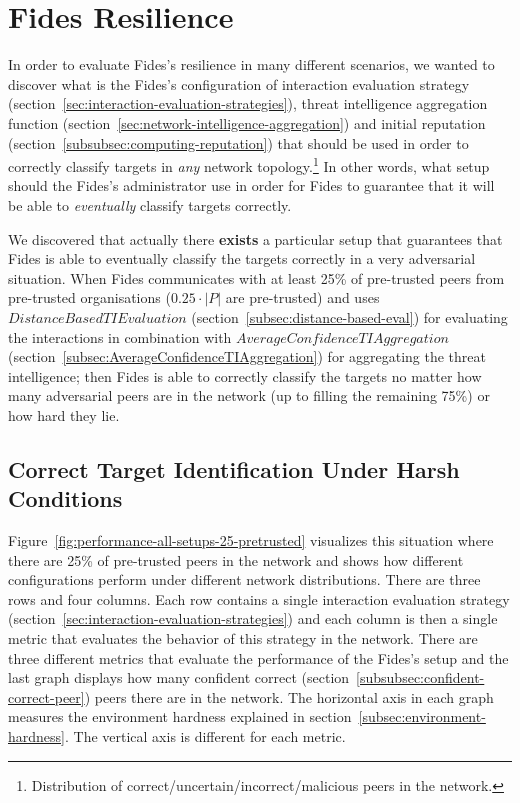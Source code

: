 \newpage
\section{Fides Resilience}
\label{sec:fides-resilience}

In order to evaluate Fides's resilience in many different scenarios, we wanted to discover what is the Fides's configuration of interaction evaluation strategy (section~\ref{sec:interaction-evaluation-strategies}), threat intelligence aggregation function (section~\ref{sec:network-intelligence-aggregation}) and initial reputation (section~\ref{subsubsec:computing-reputation}) that should be used in order to correctly classify targets in \textit{any} network topology.\footnote{Distribution of correct/uncertain/incorrect/malicious peers in the network.}
In other words, what setup should the Fides's administrator use in order for Fides to guarantee that it will be able to \textit{eventually} classify targets correctly.

We discovered that actually there \textbf{exists} a particular setup that guarantees that Fides is able to eventually classify the targets correctly in a very adversarial situation. When Fides communicates with at least 25\% of pre-trusted peers from pre-trusted organisations ($0.25 \cdot |P|$ are pre-trusted) and uses $DistanceBasedTIEvaluation$ (section~\ref{subsec:distance-based-eval}) for evaluating the interactions in combination with $AverageConfidenceTIAggregation$ (section~\ref{subsec:AverageConfidenceTIAggregation}) for aggregating the threat intelligence; then Fides is able to correctly classify the targets no matter how many adversarial peers are in the network (up to filling the remaining 75\%) or how hard they lie.

\subsection{Correct Target Identification Under Harsh Conditions}
\label{subsec:correct-target-identification-no-matter-what}

Figure~\ref{fig:performance-all-setups-25-pretrusted} visualizes this situation where there are 25\% of pre-trusted peers in the network and shows how different configurations perform under different network distributions.
There are three rows and four columns. Each row contains a single interaction evaluation strategy (section~\ref{sec:interaction-evaluation-strategies}) and each column is then a single metric that evaluates the behavior of this strategy in the network.
There are three different metrics that evaluate the performance of the Fides's setup and the last graph displays how many confident correct (section~\ref{subsubsec:confident-correct-peer}) peers there are in the network.
The horizontal axis in each graph measures the environment hardness explained in section~\ref{subsec:environment-hardness}.
The vertical axis is different for each metric.

